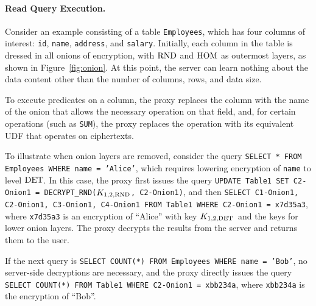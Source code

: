 \paragraph{Read Query Execution.}

Consider an example consisting of a table \texttt{Employees}, which
has four columns of interest: \texttt{id}, \texttt{name},
\texttt{address}, and {\tt salary}.  Initially, each column in the
table is dressed in all onions of encryption, with $\textrm{RND}$ and $\textrm{HOM}$
as outermost layers, as shown in Figure~\ref{fig:onion}.  At this
point, the server can learn nothing about the data content other than
the number of columns, rows, and data size.

To execute predicates on a column, the proxy replaces the column with the
name of the onion that allows the necessary operation on
that field, and, for certain operations (such as {\tt SUM}), the proxy
replaces the operation with its equivalent UDF that operates on
ciphertexts.  

To illustrate when onion layers are removed, consider the query
\texttt{SELECT * FROM Employees WHERE name = 'Alice'}, which requires
lowering encryption of {\tt name} to level $\textrm{DET}$\@.  In this case,
the proxy first issues the query \texttt{UPDATE Table1 SET C2-Onion1 =
  DECRYPT\_RND($K_{1,2,\textrm{RND}}$, C2-Onion1)}, and then \texttt{SELECT
  C1-Onion1, C2-Onion1, C3-Onion1, C4-Onion1 FROM Table1 WHERE
  C2-Onion1 = x7d35a3}, where \texttt{x7d35a3} is an encryption of
``Alice'' with key $K_{1,2,\textrm{DET}}$\ and the keys for lower onion layers.  The proxy decrypts the results
from the server and returns them to the user.

If the next query is {\tt SELECT COUNT(*) FROM Employees WHERE name =
  'Bob'}, no server-side decryptions are necessary, and the proxy
directly issues the query {\tt SELECT COUNT(*) FROM Table1 WHERE
  C2-Onion1 = xbb234a}, where \texttt{xbb234a} is the encryption of ``Bob''.




